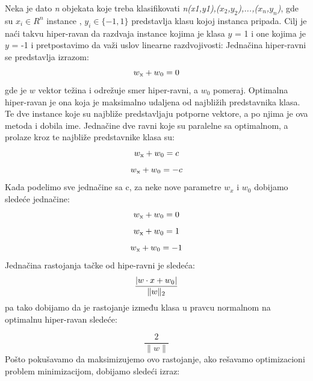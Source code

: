 \documentclass[12pt,oneside]{memoir}
\begin{document}
Neka je dato \textit{n} objekata koje treba klasifikovati \textit{n\normalfont(x1,y1\normalfont),\normalfont($x_2$,$y_2$\normalfont),...,\normalfont($x_n$,$y_n$\normalfont)},  gde su $x_i \in R^n$ instance ,   $y_i \in \{-1,1\}$ predstavlja klasu kojoj instanca pripada.  Cilj je naći takvu hiper-ravan da razdvaja instance kojima je klasa $y$ = 1 i one kojima je $y$ = -1 i pretpostavimo da važi uslov linearne razdvojivosti:
Jednačina hiper-ravni se predstavlja izrazom:
\begin{equation}
	w\textsubscript{x}+w\textsubscript{0} = 0
\end{equation}
{\setlength{\parindent}{0cm}
gde je $w$ vektor težina i odrežuje smer hiper-ravni, a $w_0$ pomeraj.  Optimalna hiper-ravan je ona koja je maksimalno udaljena od najbližih predstavnika klasa.  Te dve instance koje su najbliže predstavljaju potporne vektore, a po njima je ova metoda i dobila ime. Jednačine dve ravni koje su paralelne sa optimalnom,  a prolaze kroz te najbliže predstavnike klasa su:
}
\begin{equation}
	w\textsubscript{x}+w\textsubscript{0} = c \\
\end{equation}
\begin{equation}
	w\textsubscript{x}+w\textsubscript{0} = -c
\end{equation}
{\setlength{\parindent}{0cm}
Kada podelimo sve jednačine sa c, za neke nove parametre $w_x$ i $w_0$ dobijamo sledeće jednačine:
}
\begin{equation}
	w\textsubscript{x}+w\textsubscript{0} = 0
\end{equation}
\begin{equation}
	w\textsubscript{x}+w\textsubscript{0} = 1
\end{equation}
\begin{equation}
	w\textsubscript{x}+w\textsubscript{0} = -1
\end{equation}
\noindent
Jednačina rastojanja tačke od hipe-ravni je sledeća:
\begin{equation}
	\frac{|w \cdot x + w\textsubscript{0}|}{\|w\|\textsubscript{2}}
\end{equation}
\noindent
pa tako dobijamo da je rastojanje između klasa u pravcu normalnom na optimalnu hiper-ravan sledeće:

\begin{equation}
	\frac{2}{\|w\|}
\end{equation}
\noindent
Pošto pokušavamo da maksimizujemo ovo rastojanje,  ako rešavamo optimizacioni problem minimizacijom, dobijamo sledeći izraz:
\end{document}
